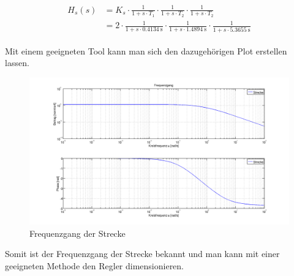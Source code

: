 
\begin{gather} \label{eq:transfer:plant}
    \begin{split}
        H_s (s) & = K_s
                  \cdot \frac{1}{1 + s \cdot T_1}
                  \cdot \frac{1}{1 + s \cdot T_2}
                  \cdot \frac{1}{1 + s \cdot T_2}                     \\
                & = 2
                  \cdot \frac{1}{1 + s \cdot \SI{0.4134}{\second}}
                  \cdot \frac{1}{1 + s \cdot \SI{1.4894}{\second}}
                  \cdot \frac{1}{1 + s \cdot \SI{5.3655}{\second}}
    \end{split}
\end{gather}

Mit einem  geeigneten Tool  kann man sich  den dazugeh\"origen  Plot erstellen
lassen.

\begin{figure}[h! width=\pagewidth]
    \includegraphics[width=\textwidth]{images/streckeFrequenzgang.png}
    \caption{%
        Frequenzgang der Strecke%
    }
    \label{fig:plant_freq}
\end{figure}

Somit  ist  der Frequenzgang  der  Strecke  bekannt  und  man kann  mit  einer
geeigneten Methode den Regler dimensionieren.
